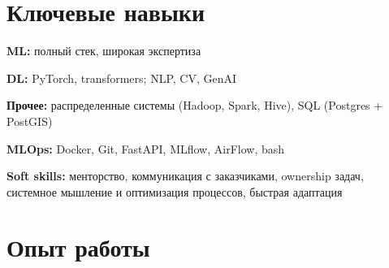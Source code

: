\documentclass[a4paper,10pt]{article}
\begin{document}
\section{Ключевые навыки}
\begin{minipage}[t]{0.48\textwidth}    
    \textbf{ML:} полный стек, широкая экспертиза
    
    \textbf{DL:} PyTorch, transformers; NLP, CV, GenAI
    
    \textbf{Прочее:} распределенные системы (Hadoop, Spark, Hive), SQL (Postgres + PostGIS)
\end{minipage}
\hfill
\begin{minipage}[t]{0.48\textwidth}   
    \textbf{MLOps:} Docker, Git, FastAPI, MLflow, AirFlow, bash
    
    \textbf{Soft skills:} менторство, коммуникация с заказчиками, ownership задач, системное мышление и оптимизация процессов, быстрая адаптация
\end{minipage}

    
    

\section{Опыт работы}
\end{document}
